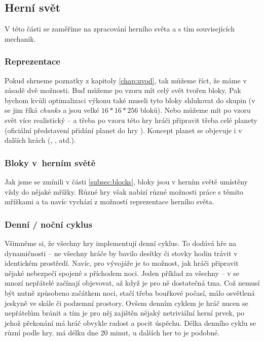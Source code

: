 \subsection{Herní svět}

V této části se zaměříme na zpracování herního světa a s tím souvisejících mechanik.

\subsubsection{Reprezentace}

Pokud shrneme poznatky z kapitoly \ref{chap:uvod}, tak můžeme říct, že máme v zásadě dvě možnosti. Buď můžeme po vzoru \MC{} mít celý svět tvořen bloky. Pak bychom kvůli optimalizaci výkonu také museli tyto bloky shlukovat do skupin (v  se jim říká \textit{chunks} a jsou velké $16*16*256$ bloků). Nebo můžeme mít po vzoru \SE{} svět více realistický -- a třeba po vzoru této hry hráči připravit třeba celé planety (oficiální představení přidání planet do hry \citep{se_planets}). Koncept planet se objevuje i v dalších hrách (\ME{}, \NMS{}, atd.).

\subsubsection{Bloky v~herním světě}

Jak jsme se zmínili v části \ref{subsec:blocks}, bloky jsou v herním světě umístěny vždy do nějaké mřížky. Různé hry však nabízí různé možnosti práce s těmito mřížkami a ta navíc vychází z možností reprezentace herního světa.


\subsubsection{Denní / noční cyklus}

Všimněme si, že všechny hry implementují denní cyklus. To dodává hře na dynamičnosti -- ne všechny hráče by bavilo desítky či stovky hodin trávit v identickém prostředí. Navíc, pro vývojáře je to možnost, jak hráči připravit nějaké nebezpečí spojené s příchodem noci. Jeden příklad za všechny -- v  se mnozí nepřátelé začínají objevovat, až když je pro ně dostatečná tma. Což nemusí být nutně způsobeno začátkem noci, stačí třeba bouřkové počasí, málo osvětlená jeskyně ve skále či podzemní prostory. Ovšem denním cyklem je hráč nucen se nepřátelům bránit a tím je pro něj zajištěn nějaký netriviální herní prvek, po jehož překonání má hráč obvykle radost a pocit úspěchu.
Délka denního cyklu se různí podle hry. \MC{} má délku dne 20 minut, u dalších her to je podobné.


